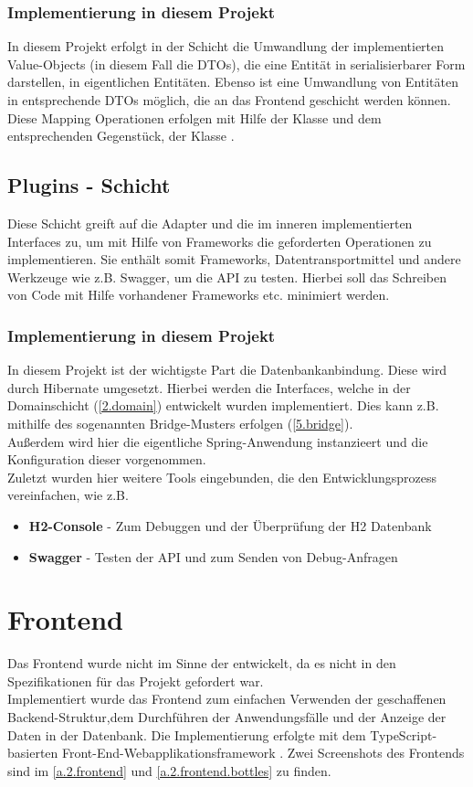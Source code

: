 			\subsubsection{Implementierung in diesem Projekt}
			In diesem Projekt erfolgt in der Schicht die Umwandlung der implementierten Value-Objects (in diesem Fall die DTOs), die eine Entität in serialisierbarer Form darstellen, in eigentlichen Entitäten. Ebenso ist eine Umwandlung von Entitäten in entsprechende DTOs möglich, die an das Frontend geschicht werden können. \\
			Diese Mapping Operationen erfolgen mit Hilfe der Klasse  und dem entsprechenden Gegenstück, der Klasse .
		
		\subsection{Plugins - Schicht}	
		Diese Schicht greift auf die Adapter und die im inneren implementierten Interfaces zu, um mit Hilfe von Frameworks die geforderten Operationen zu implementieren. Sie enthält somit Frameworks, Datentransportmittel und andere Werkzeuge wie z.B. Swagger, um die API zu testen. Hierbei soll das Schreiben von Code mit Hilfe vorhandener Frameworks etc. minimiert werden.
			\subsubsection{Implementierung in diesem Projekt}
			In diesem Projekt ist der wichtigste Part die Datenbankanbindung. Diese wird durch Hibernate umgesetzt. Hierbei werden die Interfaces, welche in der Domainschicht (\cref{2.domain}) entwickelt wurden implementiert. Dies kann z.B. mithilfe des sogenannten Bridge-Musters erfolgen (\cref{5.bridge}). \\
			Außerdem wird hier die eigentliche Spring-Anwendung instanzieert und die Konfiguration dieser vorgenommen. \\
			Zuletzt wurden hier weitere Tools eingebunden, die den Entwicklungsprozess vereinfachen, wie z.B.
			\begin{itemize}
				\item \textbf{H2-Console} - Zum Debuggen und der Überprüfung der H2 Datenbank
				\item \textbf{Swagger} - Testen der API und zum Senden von Debug-Anfragen
			\end{itemize}
		
	\section{Frontend}
	Das Frontend wurde nicht im Sinne der  entwickelt, da es nicht in den Spezifikationen für das Projekt gefordert war. \\
	Implementiert wurde das Frontend zum einfachen Verwenden der geschaffenen Backend-Struktur,dem Durchführen der Anwendungsfälle und der Anzeige der Daten in der Datenbank. Die Implementierung erfolgte mit dem TypeScript-basierten Front-End-Webapplikationsframework  \cite{angular.angular}. Zwei Screenshots des Frontends sind im \cref{a.2.frontend} und \cref{a.2.frontend.bottles} zu finden.
			
	
	
